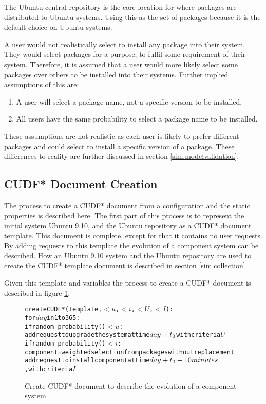 The Ubuntu central repository is the core location for where packages are distributed to Ubuntu systems.
Using this as the set of packages because it is the default choice on Ubuntu systems.

A user would not realistically select to install any package into their system.
They would select packages for a purpose, to fulfil some requirement of their system.
Therefore, it is assumed that a user would more likely select some packages over others to be installed into their systems.
Further implied assumptions of this are:
\begin{enumerate}
  \item A user will select a package name, not a specific version to be installed.
  \item All users have the same probability to select a package name to be installed. 
\end{enumerate}
These assumptions are not realistic as each user is likely to prefer different packages and could select to install a specific version of a package. 
These differences to reality are further discussed in section \ref{sim.modelvalidation}.

\subsection{CUDF* Document Creation}
The process to create a CUDF* document from a configuration and the static properties is described here.
The first part of this process is to represent the initial system Ubuntu 9.10, and the Ubuntu repository as a CUDF* document template.
This document is complete, except for that it contains no user requests.
By adding requests to this template the evolution of a component system can be described.
How an Ubuntu 9.10 system and the Ubuntu repository are used to create the CUDF* template document is described in section \ref{sim.collection}.

Given this template and \usermodel variables the process to create a CUDF* document is described in figure \ref{sim.CUDF*}.
\begin{figure}[h]
\begin{center}
\begin{alltt}
createCUDF*(template, \(< u\), \(< i\), \(< U\), \(< I\)):
  for \(day\) in 1 to 365:
    if random-probability() \(< u\):
      add request to upgrade the system at time \(day + t\sb{0}\) with criteria \(U\)
    if random-probability() \(< i\):  
      component = weighted selection from packages without replacement 
      add request to install component at time \(day + t\sb{0} + 10 minutes\), with criteria \(I\)
\end{alltt}
  \caption{Create CUDF* document to describe the evolution of a component system}
  \label{sim.CUDF*}
\end{center}
\end{figure}

